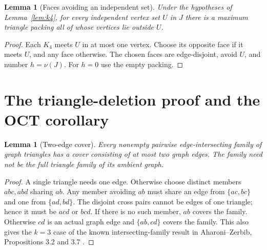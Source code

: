 \documentclass[11pt]{article}
\newtheorem{lemma}[theorem]{Lemma}
\begin{document}
\begin{lemma}[Faces avoiding an independent set]\label{lem:faces}
Under the hypotheses of Lemma~\ref{lem:k4}, for every independent vertex
set $U$ in $J$ there is a maximum triangle packing all of whose vertices
lie outside $U$.
\end{lemma}
\begin{proof}
Each $K_4$ meets $U$ in at most one vertex. Choose its opposite face if
it meets $U$, and any face otherwise. The chosen faces are edge-disjoint,
avoid $U$, and number $h=\nu(J)$. For $h=0$ use the empty packing.
\end{proof}

\section{The triangle-deletion proof and the OCT corollary}
\begin{lemma}[Two-edge cover]\label{lem:intersecting}
Every nonempty pairwise edge-intersecting family of graph triangles has
a cover consisting of at most two graph edges. The family need not be
the full triangle family of its ambient graph.
\end{lemma}
\begin{proof}
A single triangle needs one edge. Otherwise choose distinct members
$abc,abd$ sharing $ab$. Any member avoiding $ab$ must share an edge from
$\{ac,bc\}$ and one from $\{ad,bd\}$. The disjoint cross pairs cannot
be edges of one triangle; hence it must be $acd$ or $bcd$.
If there is no such member, $ab$ covers the family. Otherwise $cd$ is
an actual graph edge and $\{ab,cd\}$ covers the family.
This also gives the $k=3$ case of the known intersecting-family result
in Aharoni--Zerbib, Propositions 3.2 and 3.7 \cite{AZ}.
\end{proof}
\end{document}
